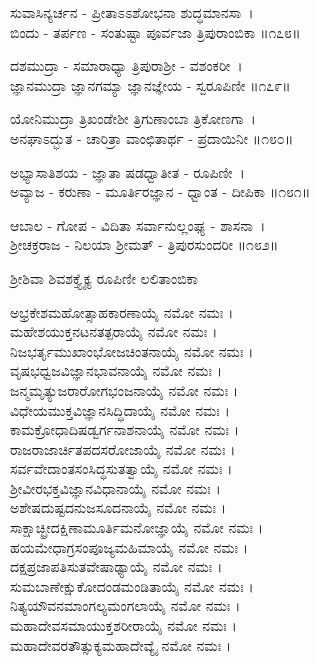 ಸುವಾಸಿನ್ಯರ್ಚನ - ಪ್ರೀತಾಽಽಶೋಭನಾ ಶುದ್ಧಮಾನಸಾ~।\\
ಬಿಂದು - ತರ್ಪಣ - ಸಂತುಷ್ಟಾ ಪೂರ್ವಜಾ ತ್ರಿಪುರಾಂಬಿಕಾ ॥೧೭೮॥

ದಶಮುದ್ರಾ - ಸಮಾರಾಧ್ಯಾ ತ್ರಿಪುರಾಶ್ರೀ - ವಶಂಕರೀ~।\\
ಜ್ಞಾನಮುದ್ರಾ ಜ್ಞಾನಗಮ್ಯಾ ಜ್ಞಾನಜ್ಞೇಯ - ಸ್ವರೂಪಿಣೀ ॥೧೭೯॥

ಯೋನಿಮುದ್ರಾ ತ್ರಿಖಂಡೇಶೀ ತ್ರಿಗುಣಾಂಬಾ ತ್ರಿಕೋಣಗಾ~।\\
ಅನಘಾಽದ್ಭುತ - ಚಾರಿತ್ರಾ ವಾಂಛಿತಾರ್ಥ - ಪ್ರದಾಯಿನೀ ॥೧೮೦॥

ಅಭ್ಯಾಸಾತಿಶಯ - ಜ್ಞಾತಾ ಷಡಧ್ವಾತೀತ - ರೂಪಿಣೀ~।\\
ಅವ್ಯಾಜ - ಕರುಣಾ - ಮೂರ್ತಿರಜ್ಞಾನ - ಧ್ವಾಂತ - ದೀಪಿಕಾ ॥೧೮೧॥

ಆಬಾಲ - ಗೋಪ - ವಿದಿತಾ ಸರ್ವಾನುಲ್ಲಂಘ್ಯ - ಶಾಸನಾ~।\\
ಶ್ರೀಚಕ್ರರಾಜ - ನಿಲಯಾ ಶ್ರೀಮತ್ - ತ್ರಿಪುರಸುಂದರೀ ॥೧೮೨॥

ಶ್ರೀಶಿವಾ ಶಿವಶಕ್ತ್ಯೈಕ್ಯ  ರೂಪಿಣೀ ಲಲಿತಾಂಬಿಕಾ

ಅಭ್ರಕೇಶಮಹೋತ್ಸಾಹಕಾರಣಾಯೈ ನಮೋ ನಮಃ ।\\
ಮಹೇಶಯುಕ್ತನಟನತತ್ಪರಾಯೈ ನಮೋ ನಮಃ ।\\
ನಿಜಭರ್ತೃಮುಖಾಂಭೋಜಚಿಂತನಾಯೈ ನಮೋ ನಮಃ ।\\
ವೃಷಭಧ್ವಜವಿಜ್ಞಾನಭಾವನಾಯೈ ನಮೋ ನಮಃ ।\\
ಜನ್ಮಮೃತ್ಯುಜರಾರೋಗಭಂಜನಾಯೈ ನಮೋ ನಮಃ ।\\
ವಿಧೇಯಮುಕ್ತವಿಜ್ಞಾನಸಿದ್ಧಿದಾಯೈ ನಮೋ ನಮಃ ।\\
ಕಾಮಕ್ರೋಧಾದಿಷಡ್ವರ್ಗನಾಶನಾಯೈ ನಮೋ ನಮಃ ।\\
ರಾಜರಾಜಾರ್ಚಿತಪದಸರೋಜಾಯೈ ನಮೋ ನಮಃ ।\\
ಸರ್ವವೇದಾಂತಸಂಸಿದ್ಧಸುತತ್ವಾಯೈ ನಮೋ ನಮಃ ।\\
ಶ್ರೀವೀರಭಕ್ತವಿಜ್ಞಾನವಿಧಾನಾಯೈ ನಮೋ ನಮಃ ।\\
ಅಶೇಷದುಷ್ಟದನುಜಸೂದನಾಯೈ ನಮೋ ನಮಃ ।\\
ಸಾಕ್ಷಾಚ್ಛ್ರೀದಕ್ಷಿಣಾಮೂರ್ತಿಮನೋಜ್ಞಾಯೈ ನಮೋ ನಮಃ ।\\
ಹಯಮೇಧಾಗ್ರಸಂಪೂಜ್ಯಮಹಿಮಾಯೈ ನಮೋ ನಮಃ ।\\
ದಕ್ಷಪ್ರಜಾಪತಿಸುತವೇಷಾಢ್ಯಾಯೈ ನಮೋ ನಮಃ ।\\
ಸುಮಬಾಣೇಕ್ಷುಕೋದಂಡಮಂಡಿತಾಯೈ ನಮೋ ನಮಃ ।\\
ನಿತ್ಯಯೌವನಮಾಂಗಲ್ಯಮಂಗಲಾಯೈ ನಮೋ ನಮಃ ।\\
ಮಹಾದೇವಸಮಾಯುಕ್ತಶರೀರಾಯೈ ನಮೋ ನಮಃ ।\\
ಮಹಾದೇವರತೌತ್ಸುಕ್ಯಮಹಾದೇವ್ಯೈ ನಮೋ ನಮಃ ।


